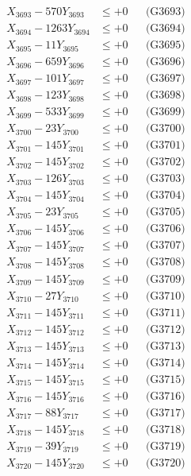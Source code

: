 \documentclass[a4paper,10pt]{article}
\begin{document}
{\begin{align}
X_{3693} - 570Y_{3693} &\leq +0 && \text{(G3693)} \\
X_{3694} - 1263Y_{3694} &\leq +0 && \text{(G3694)} \\
X_{3695} - 11Y_{3695} &\leq +0 && \text{(G3695)} \\
X_{3696} - 659Y_{3696} &\leq +0 && \text{(G3696)} \\
X_{3697} - 101Y_{3697} &\leq +0 && \text{(G3697)} \\
X_{3698} - 123Y_{3698} &\leq +0 && \text{(G3698)} \\
X_{3699} - 533Y_{3699} &\leq +0 && \text{(G3699)} \\
X_{3700} - 23Y_{3700} &\leq +0 && \text{(G3700)} \\
\allowbreak
X_{3701} - 145Y_{3701} &\leq +0 && \text{(G3701)} \\
X_{3702} - 145Y_{3702} &\leq +0 && \text{(G3702)} \\
X_{3703} - 126Y_{3703} &\leq +0 && \text{(G3703)} \\
X_{3704} - 145Y_{3704} &\leq +0 && \text{(G3704)} \\
X_{3705} - 23Y_{3705} &\leq +0 && \text{(G3705)} \\
X_{3706} - 145Y_{3706} &\leq +0 && \text{(G3706)} \\
X_{3707} - 145Y_{3707} &\leq +0 && \text{(G3707)} \\
X_{3708} - 145Y_{3708} &\leq +0 && \text{(G3708)} \\
X_{3709} - 145Y_{3709} &\leq +0 && \text{(G3709)} \\
X_{3710} - 27Y_{3710} &\leq +0 && \text{(G3710)} \\
\allowbreak
X_{3711} - 145Y_{3711} &\leq +0 && \text{(G3711)} \\
X_{3712} - 145Y_{3712} &\leq +0 && \text{(G3712)} \\
X_{3713} - 145Y_{3713} &\leq +0 && \text{(G3713)} \\
X_{3714} - 145Y_{3714} &\leq +0 && \text{(G3714)} \\
X_{3715} - 145Y_{3715} &\leq +0 && \text{(G3715)} \\
X_{3716} - 145Y_{3716} &\leq +0 && \text{(G3716)} \\
X_{3717} - 88Y_{3717} &\leq +0 && \text{(G3717)} \\
X_{3718} - 145Y_{3718} &\leq +0 && \text{(G3718)} \\
X_{3719} - 39Y_{3719} &\leq +0 && \text{(G3719)} \\
X_{3720} - 145Y_{3720} &\leq +0 && \text{(G3720)} \\

\end{align}}
\end{document}

